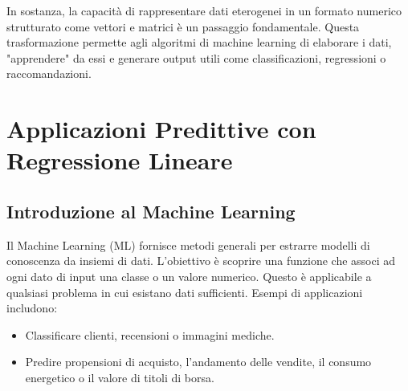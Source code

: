 \documentclass{article}
\begin{document}
In sostanza, la capacità di rappresentare dati eterogenei in un formato numerico strutturato come vettori e matrici è un passaggio fondamentale. Questa trasformazione permette agli algoritmi di machine learning di elaborare i dati, "apprendere" da essi e generare output utili come classificazioni, regressioni o raccomandazioni.



\section{Applicazioni Predittive con Regressione Lineare}


\subsection{Introduzione al Machine Learning}
Il Machine Learning (ML) fornisce metodi generali per estrarre modelli di conoscenza da insiemi di dati. L'obiettivo è scoprire una funzione che associ ad ogni dato di input una classe o un valore numerico. Questo è applicabile a qualsiasi problema in cui esistano dati sufficienti.
Esempi di applicazioni includono:
\begin{itemize}
    \item Classificare clienti, recensioni o immagini mediche.
    \item Predire propensioni di acquisto, l'andamento delle vendite, il consumo energetico o il valore di titoli di borsa.
\end{itemize}
\end{document}

